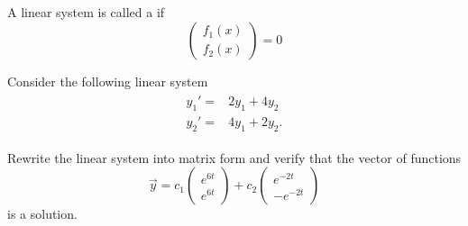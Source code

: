 A linear system is called a  if 
\[
\begin{pmatrix}
  f_1(x) \\ f_2(x)
\end{pmatrix} = 0 
\]

\begin{example}
  Consider the following linear system
  \[
  \begin{aligned}
    \begin{aligned}
      y_1'=&2y_1 + 4y_2\\ 
      y_2'=&4y_1 + 2y_2.
    \end{aligned}
  \end{aligned}  
  \]

  Rewrite the linear system into matrix form and verify that the vector of functions
  \[
    \vec{y}=
    c_1
    \begin{pmatrix}
      e^{6t} \\ e^{6t}
    \end{pmatrix}
    +c_2
    \begin{pmatrix}
      e^{-2t} \\
      -e^{-2t}
    \end{pmatrix}
  \]
  is a solution.
\end{example}
